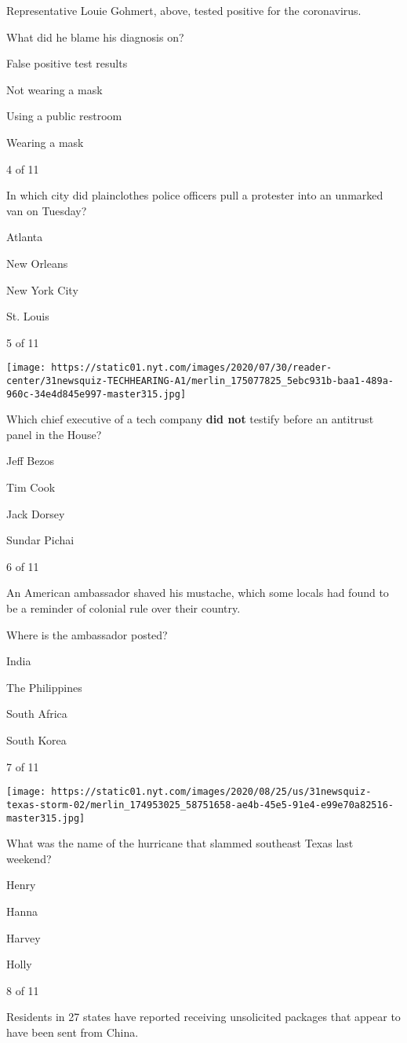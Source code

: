 Representative Louie Gohmert, above, tested positive for the
coronavirus.

What did he blame his diagnosis on?

False positive test results

Not wearing a mask

Using a public restroom

Wearing a mask

4 of 11

In which city did plainclothes police officers pull a protester into an
unmarked van on Tuesday?

Atlanta

New Orleans

New York City

St. Louis

5 of 11

\texttt{[image: https://static01.nyt.com/images/2020/07/30/reader-center/31newsquiz-TECHHEARING-A1/merlin\_175077825\_5ebc931b-baa1-489a-960c-34e4d845e997-master315.jpg]}

Which chief executive of a tech company \textbf{did not} testify before
an antitrust panel in the House?

Jeff Bezos

Tim Cook

Jack Dorsey

Sundar Pichai

6 of 11

An American ambassador shaved his mustache, which some locals had found
to be a reminder of colonial rule over their country.

Where is the ambassador posted?

India

The Philippines

South Africa

South Korea

7 of 11

\texttt{[image: https://static01.nyt.com/images/2020/08/25/us/31newsquiz-texas-storm-02/merlin\_174953025\_58751658-ae4b-45e5-91e4-e99e70a82516-master315.jpg]}

What was the name of the hurricane that slammed southeast Texas last
weekend?

Henry

Hanna

Harvey

Holly

8 of 11

Residents in 27 states have reported receiving unsolicited packages that
appear to have been sent from China.

